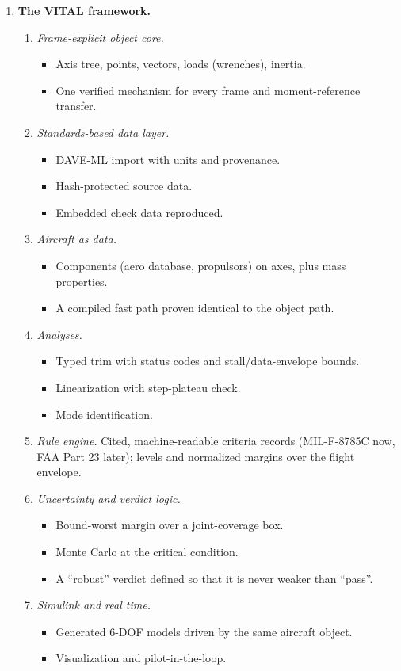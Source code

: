 \documentclass[11pt]{article}
\begin{document}
\begin{enumerate}[label=\arabic*.,leftmargin=*]
\item \textbf{The VITAL framework.}
  \begin{enumerate}[label*=\arabic*.]
    \item \emph{Frame-explicit object core.}
      \begin{itemize}
        \item Axis tree, points, vectors, loads (wrenches), inertia.
        \item One verified mechanism for every frame and moment-reference
          transfer.
      \end{itemize}
    \item \emph{Standards-based data layer.}
      \begin{itemize}
        \item DAVE-ML import with units and provenance.
        \item Hash-protected source data.
        \item Embedded check data reproduced.
      \end{itemize}
    \item \emph{Aircraft as data.}
      \begin{itemize}
        \item Components (aero database, propulsors) on axes, plus mass
          properties.
        \item A compiled fast path proven identical to the object path.
      \end{itemize}
    \item \emph{Analyses.}
      \begin{itemize}
        \item Typed trim with status codes and stall/data-envelope bounds.
        \item Linearization with step-plateau check.
        \item Mode identification.
      \end{itemize}
    \item \emph{Rule engine.} Cited, machine-readable criteria records
      (MIL-F-8785C now, FAA Part 23 later); levels and normalized margins
      over the flight envelope.
    \item \emph{Uncertainty and verdict logic.}
      \begin{itemize}
        \item Bound-worst margin over a joint-coverage box.
        \item Monte Carlo at the critical condition.
        \item A ``robust'' verdict defined so that it is never weaker than
          ``pass''.
      \end{itemize}
    \item \emph{Simulink and real time.}
      \begin{itemize}
        \item Generated 6-DOF models driven by the same aircraft object.
        \item Visualization and pilot-in-the-loop.
      \end{itemize}
  \end{enumerate}


\end{enumerate}
\end{document}
